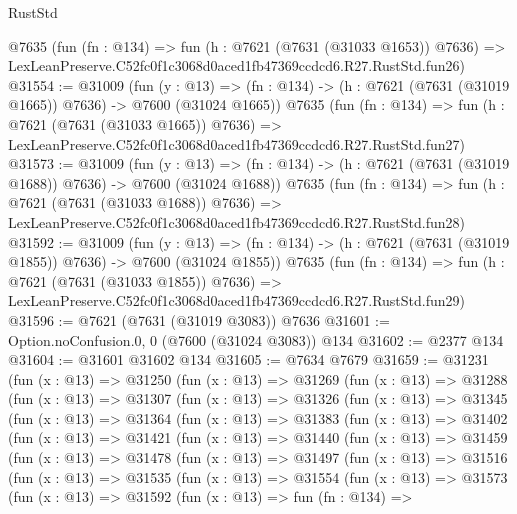 \begin{lexlean}{RustStd}
\begin{coremodule}
    @7635
    (fun (fn : @134) =>
    fun (h : @7621 (@7631 (@31033 @1653)) @7636) =>
    LexLeanPreserve.C52fc0f1c3068d0aced1fb47369ccdcd6.R27.RustStd.fun26)
@31554 := @31009
    (fun (y : @13) =>
    (fn : @134) -> (h : @7621 (@7631 (@31019 @1665)) @7636) -> @7600 (@31024 @1665))
    @7635
    (fun (fn : @134) =>
    fun (h : @7621 (@7631 (@31033 @1665)) @7636) =>
    LexLeanPreserve.C52fc0f1c3068d0aced1fb47369ccdcd6.R27.RustStd.fun27)
@31573 := @31009
    (fun (y : @13) =>
    (fn : @134) -> (h : @7621 (@7631 (@31019 @1688)) @7636) -> @7600 (@31024 @1688))
    @7635
    (fun (fn : @134) =>
    fun (h : @7621 (@7631 (@31033 @1688)) @7636) =>
    LexLeanPreserve.C52fc0f1c3068d0aced1fb47369ccdcd6.R27.RustStd.fun28)
@31592 := @31009
    (fun (y : @13) =>
    (fn : @134) -> (h : @7621 (@7631 (@31019 @1855)) @7636) -> @7600 (@31024 @1855))
    @7635
    (fun (fn : @134) =>
    fun (h : @7621 (@7631 (@31033 @1855)) @7636) =>
    LexLeanPreserve.C52fc0f1c3068d0aced1fb47369ccdcd6.R27.RustStd.fun29)
@31596 := @7621 (@7631 (@31019 @3083)) @7636
@31601 := Option.noConfusion.{0, 0} (@7600 (@31024 @3083)) @134
@31602 := @2377 @134
@31604 := @31601 @31602 @134
@31605 := @7634 @7679
@31659 := @31231
    (fun (x : @13) =>
    @31250
      (fun (x : @13) =>
      @31269
        (fun (x : @13) =>
        @31288
          (fun (x : @13) =>
          @31307
            (fun (x : @13) =>
            @31326
              (fun (x : @13) =>
              @31345
                (fun (x : @13) =>
                @31364
                  (fun (x : @13) =>
                  @31383
                    (fun (x : @13) =>
                    @31402
                      (fun (x : @13) =>
                      @31421
                        (fun (x : @13) =>
                        @31440
                          (fun (x : @13) =>
                          @31459
                            (fun (x : @13) =>
                            @31478
                              (fun (x : @13) =>
                              @31497
                                (fun (x : @13) =>
                                @31516
                                  (fun (x : @13) =>
                                  @31535
                                    (fun (x : @13) =>
                                    @31554
                                      (fun (x : @13) =>
                                      @31573
                                        (fun (x : @13) =>
                                        @31592
                                          (fun (x : @13) =>
                                          fun (fn : @134) =>

\end{coremodule}
\end{lexlean}
